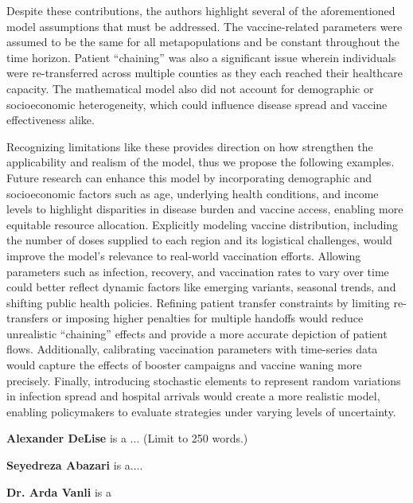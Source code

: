 \documentclass{article}
\begin{document}
Despite these contributions, the authors highlight several of the aforementioned model assumptions that must be addressed. The vaccine-related parameters were assumed to be the same for all metapopulations and be constant throughout the time horizon. Patient ``chaining'' was also a significant issue wherein individuals were re-transferred across multiple counties as they each reached their healthcare capacity. The mathematical model also did not account for demographic or socioeconomic heterogeneity, which could influence disease spread and vaccine effectiveness alike. 

Recognizing limitations like these provides direction on how strengthen the applicability and realism of the model, thus we propose the following examples. Future research can enhance this model by incorporating demographic and socioeconomic factors such as age, underlying health conditions, and income levels to highlight disparities in disease burden and vaccine access, enabling more equitable resource allocation. Explicitly modeling vaccine distribution, including the number of doses supplied to each region and its logistical challenges, would improve the model's relevance to real-world vaccination efforts. Allowing parameters such as infection, recovery, and vaccination rates to vary over time could better reflect dynamic factors like emerging variants, seasonal trends, and shifting public health policies. Refining patient transfer constraints by limiting re-transfers or imposing higher penalties for multiple handoffs would reduce unrealistic ``chaining'' effects and provide a more accurate depiction of patient flows. Additionally, calibrating vaccination parameters with time-series data would capture the effects of booster campaigns and vaccine waning more precisely. Finally, introducing stochastic elements to represent random variations in infection spread and hospital arrivals would create a more realistic model, enabling policymakers to evaluate strategies under varying levels of uncertainty.



\printbibliography[heading=subbibintoc, title={References}]


\begin{ieombiography}
  \textbf{Alexander DeLise} is a ...
  (Limit to 250 words.)

  \noindent \textbf{Seyedreza Abazari} is a....

  \noindent \textbf{Dr. Arda Vanli} is a %
\end{ieombiography}
 
\end{document}
